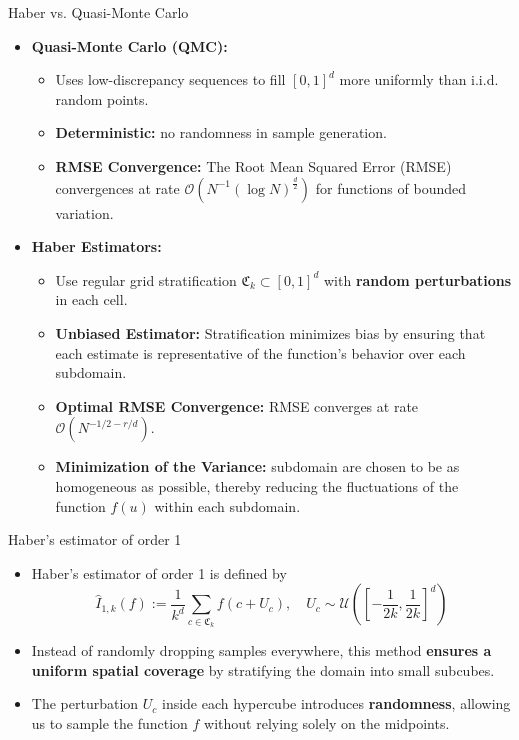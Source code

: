 \documentclass[aspectratio=169,xcolor=dvipsnames]{beamer}
\begin{document}
 

    \begin{frame}{Haber vs. Quasi-Monte Carlo}
        \begin{itemize}
            \item<1->\textbf{Quasi-Monte Carlo (QMC):}
            \begin{itemize}
                \item Uses low-discrepancy sequences to fill \([0,1]^d\) more uniformly than i.i.d. random points.
                \item \textbf{Deterministic:} no randomness in sample generation.
                \item \textbf{RMSE Convergence:} The Root Mean Squared Error (RMSE) convergences at rate  \( \mathcal{O}(N^{-1} (\log N)^\frac{d}{2}) \) for functions of bounded variation.
    
            \end{itemize}
            
            \vspace{1em}
            
            \item<2->\textbf{Haber Estimators:}
            \begin{itemize}
                \item Use regular grid stratification \( \mathfrak{C}_k \subset [0,1]^d \) with \textbf{random perturbations} in each cell.
                \item \textbf{Unbiased Estimator:} Stratification minimizes bias by ensuring that each estimate is representative of the function's behavior over each subdomain.
                \item \textbf{Optimal RMSE Convergence:} RMSE converges at rate \( \mathcal{O}(N^{-1/2 - r/d}) \).
                \item \textbf{Minimization of the Variance:} subdomain are chosen to be as homogeneous as possible, thereby reducing the fluctuations of the function \( f(u) \) within each subdomain.
            \end{itemize}
        \end{itemize}
    \end{frame}

    \begin{frame}{Haber's estimator of order 1}
        \begin{itemize}
            \item<1-> Haber's estimator of order 1 is defined by
            $$\hat{I}_{1,k}(f) := \frac{1}{k^d} \sum_{c \in \mathfrak{C}_k} f(c + U_c), \quad U_c \sim \mathcal{U}\left(\left[-\frac{1}{2k}, \frac{1}{2k}\right]^d\right)$$
            \item<2-> Instead of randomly dropping samples everywhere, this method \textbf{ensures a uniform spatial coverage} by stratifying the domain into small subcubes.
        
            \item<3-> The perturbation $U_c$ inside each hypercube introduces \textbf{randomness}, allowing us to sample the function $f$ without relying solely on the midpoints.
        \end{itemize}
    \end{frame}
\end{document}
